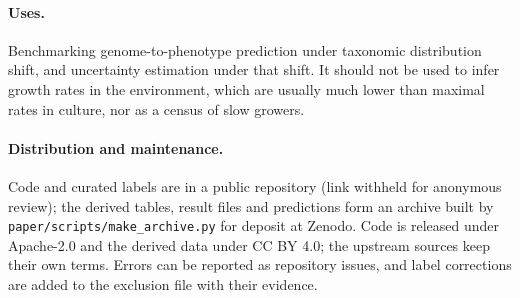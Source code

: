 \paragraph{Uses.} Benchmarking genome-to-phenotype prediction under taxonomic distribution shift, and uncertainty
estimation under that shift. It should not be used to infer growth rates in the environment, which are usually much lower
than maximal rates in culture, nor as a census of slow growers.

\paragraph{Distribution and maintenance.} Code and curated labels are in a public repository
(link withheld for anonymous review); the derived tables, result files and predictions form an archive
built by \texttt{paper/scripts/make\_archive.py} for deposit at Zenodo. Code is released under Apache-2.0 and the derived
data under CC BY 4.0; the upstream sources keep their own terms. Errors can be reported as repository issues, and label
corrections are added to the exclusion file with their evidence.
